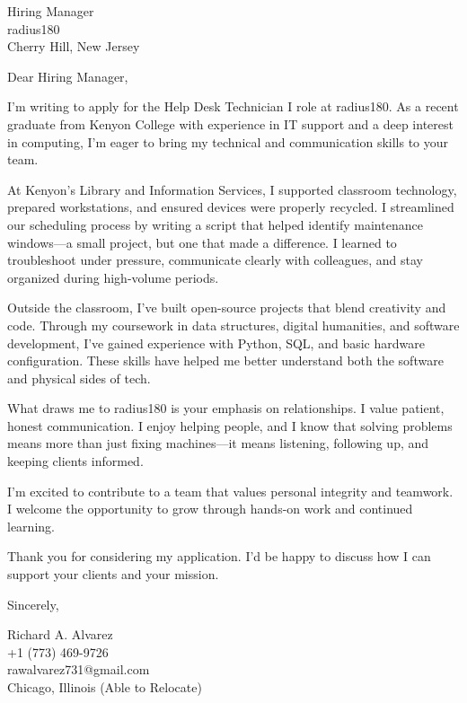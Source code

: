 \documentclass[a4paper,10pt]{letter}
\begin{document}
\begin{letter}{
Hiring Manager \\
radius180 \\
Cherry Hill, New Jersey}

\opening{Dear Hiring Manager,}

I'm writing to apply for the Help Desk Technician I role at radius180. As a recent graduate from Kenyon College with experience in IT support and a deep interest in computing, I’m eager to bring my technical and communication skills to your team.

At Kenyon’s Library and Information Services, I supported classroom technology, prepared workstations, and ensured devices were properly recycled. I streamlined our scheduling process by writing a script that helped identify maintenance windows—a small project, but one that made a difference. I learned to troubleshoot under pressure, communicate clearly with colleagues, and stay organized during high-volume periods.

Outside the classroom, I’ve built open-source projects that blend creativity and code. Through my coursework in data structures, digital humanities, and software development, I’ve gained experience with Python, SQL, and basic hardware configuration. These skills have helped me better understand both the software and physical sides of tech.

What draws me to radius180 is your emphasis on relationships. I value patient, honest communication. I enjoy helping people, and I know that solving problems means more than just fixing machines—it means listening, following up, and keeping clients informed.

I’m excited to contribute to a team that values personal integrity and teamwork. I welcome the opportunity to grow through hands-on work and continued learning.

Thank you for considering my application. I’d be happy to discuss how I can support your clients and your mission.

\closing{Sincerely,}

Richard A. Alvarez \\
+1 (773) 469-9726 \\
rawalvarez731@gmail.com \\
Chicago, Illinois (Able to Relocate)

\end{letter}
\end{document}
